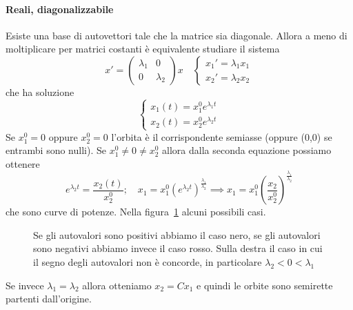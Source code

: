 \paragraph{Reali, diagonalizzabile } Esiste una base di autovettori tale che la
matrice sia diagonale. Allora a meno di moltiplicare per matrici costanti è
equivalente studiare il sistema
\[
    x' = \begin{pmatrix}
        \lambda_{1} & 0 \\
        0 & \lambda_{2}
    \end{pmatrix} x \quad \begin{cases}
    x_{1}' = \lambda_{1}x_{1} \\ x_{2}' = \lambda_{2}x_{2}
    \end{cases}
\]
che ha soluzione
\[
  \begin{cases}
      x_{1}{(t)} = x_{1}^{0} e^{\lambda_{1} t} \\
      x_{2}{(t)} = x_{2}^{0} e^{\lambda_{2} t}
  \end{cases}
\]
Se \(x_{1}^{0} = 0\) oppure \(x_{2}^{0}= 0 \) l'orbita è il corrispondente
semiasse (oppure (0,0) se entrambi sono nulli). Se \(x_{1}^{0} \neq 0 \neq
x_{2}^{0}\) allora dalla seconda equazione possiamo ottenere
\[
  e^{\lambda_{2} t} = \frac{x_{2}{(t)}}{x_{2}^{0}}; \quad
      x_{1} = x_{1}^{0} {\left( e^{\lambda_{2} t}
      \right)}^{\frac{\lambda_{1}}{\lambda_{2}}} \implies 
      x_{1} = x_{1}^{0}{\left( \frac{x_{2}}{x_{2}^{0}} \right)}^{
      \frac{\lambda_{1}}{\lambda_{2}}}
\]
che sono curve di potenze. Nella
figura~\ref{fig:orbite-problema-reali-diagonalizzabile} alcuni possibili casi.
\begin{figure}[ht]
    \centering
    \caption{Se gli autovalori sono positivi abbiamo il caso nero, se gli
    autovalori sono negativi abbiamo invece il caso rosso. Sulla destra il caso
in cui il segno degli autovalori non è concorde, in particolare \(\lambda_{2} <
0 < \lambda_1\) }
    \label{fig:orbite-problema-reali-diagonalizzabile}
\end{figure}
Se invece \(\lambda_{1} = \lambda_{2}\) allora otteniamo \(x_{2} = Cx_{1}\) e
quindi le orbite sono semirette partenti dall'origine.

